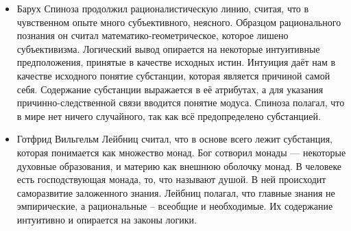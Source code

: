 \begin{itemize}
    \item Барух Спиноза продолжил рационалистическую линию, считая, что в чувственном опыте много субъективного, неясного. Образцом рационального познания он считал математико-геометрическое, которое лишено субъективизма. Логический вывод опирается на некоторые интуитивные предположения, принятые в качестве исходных истин. Интуиция даёт нам в качестве исходного понятие субстанции, которая является причиной самой себя. Содержание субстанции выражается в её атрибутах, а для указания причинно-следственной связи вводится понятие модуса. Спиноза полагал, что в мире нет ничего случайного, так как всё предопределено субстанцией.
    \item Готфрид Вильгельм Лейбниц считал, что в основе всего лежит субстанция, которая понимается как множество монад. Бог сотворил монады --- некоторые духовные образования, и материю как внешнюю оболочку монад. В человеке есть господствующая монада, то, что называют душой. В ней происходит саморазвитие заложенного знания. Лейбниц полагал, что главные знания не эмпирические, а рациональные -- всеобщие и необходимые. Их содержание интуитивно и опирается на законы логики.
\end{itemize}